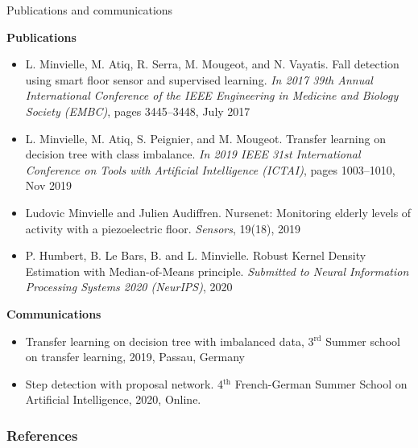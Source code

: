 \documentclass[8pt,t,aspectratio=1610]{beamer}
\begin{document}
\begin{frame}[noframenumbering]{Publications and communications}

\small
\centering
\textbf{Publications}
\begin{itemize}
    \item L. Minvielle, M. Atiq, R. Serra, M. Mougeot, and N. Vayatis. \textcolor{myblue}{Fall detection using smart floor sensor and supervised learning.}
\textit{In 2017 39th Annual International Conference of the IEEE Engineering in Medicine and Biology Society (EMBC)}, pages
3445–3448, July 2017
    \item L. Minvielle, M. Atiq, S. Peignier, and M. Mougeot. \textcolor{myblue}{Transfer learning on decision tree with class imbalance.}
\textit{In 2019 IEEE 31st International Conference on Tools with Artificial Intelligence (ICTAI)}, pages 1003–1010, Nov 2019
    \item Ludovic Minvielle and Julien Audiffren. \textcolor{myblue}{Nursenet: Monitoring elderly levels of activity with a piezoelectric floor.}
\textit{Sensors}, 19(18), 2019
    \item P. Humbert, B. Le Bars, B. and L. Minvielle. \textcolor{myblue}{Robust Kernel Density Estimation with Median-of-Means principle}. \textit{Submitted to Neural Information Processing Systems 2020 (NeurIPS)}, 2020
\end{itemize}
\medskip
\centering
\textbf{Communications}
\begin{itemize}
    \item Transfer learning on decision tree with imbalanced data, 3$^{\text{rd}}$ Summer school on transfer learning, 2019, Passau, Germany
    \item Step detection with proposal network. 4$^{\text{th}}$ French-German Summer School on Artificial Intelligence, 2020, Online.
\end{itemize}

\end{frame}

\appendix

  
\begin{frame}
        \small
        \frametitle{References}
%         
        
%         
        
\end{frame}
\end{document}
